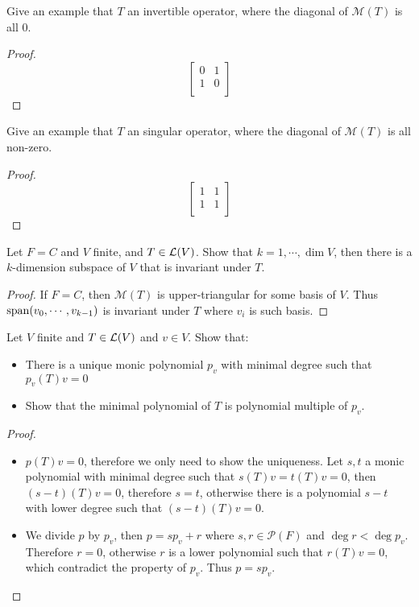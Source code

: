\documentclass[../main.tex]{subfiles}
\begin{document}
\begin{exercise}
  Give an example that $T$ an invertible operator, where the diagonal of $\mathcal{M}(T)$ is all $0$.
\end{exercise}
\begin{proof}
  \[
  \begin{bmatrix}
    0 & 1 \\
    1 & 0 \\
  \end{bmatrix}
  \]
\end{proof}

\begin{exercise}
  Give an example that $T$ an singular operator, where the diagonal of $\mathcal{M}(T)$ is all non-zero.
\end{exercise}
\begin{proof}
  \[
  \begin{bmatrix}
    1 & 1 \\
    1 & 1 \\
  \end{bmatrix}
  \]
\end{proof}

\begin{exercise}
  Let $F = C$ and $V$ finite, and $T \in \mathcal{L}(V)$. Show that $k = 1, \cdots, \dim V$,
  then there is a $k$-dimension subspace of $V$ that is invariant under $T$.
\end{exercise}
\begin{proof}
  If $F = C$, then $\mathcal{M}(T)$ is upper-triangular for some basis of $V$.
  Thus $\operatorname{span}(v_0 , \cdots , v_{k - 1})$ is invariant under $T$ where $v_i$ is such basis.
\end{proof}

\begin{exercise}
  Let $V$ finite and $T \in \mathcal{L}(V)$ and $v \in V$. Show that:
  \begin{itemize}
    \item There is a unique monic polynomial $p_v$ with minimal degree such that $p_v(T)v = 0$
    \item Show that the minimal polynomial of $T$ is polynomial multiple of $p_v$.
  \end{itemize}
\end{exercise}
\begin{proof}
  ~
  \begin{itemize}
    \item $p(T)v = 0$, therefore we only need to show the uniqueness.
          Let $s, t$ a monic polynomial with minimal degree such that $s(T)v = t(T)v = 0$,
          then $(s - t)(T)v = 0$, therefore $s = t$, otherwise there is a polynomial $s - t$ with lower degree such that $(s - t)(T)v = 0$.
    \item We divide $p$ by $p_v$, then $p = s p_v + r$ where $s, r \in \mathcal{P}(F)$
          and $\deg r < \deg p_v$. Therefore $r = 0$, otherwise $r$ is a lower polynomial
          such that $r(T)v = 0$, which contradict the property of $p_v$.
          Thus $p = sp_v$.
  \end{itemize}
\end{proof}
\end{document}
